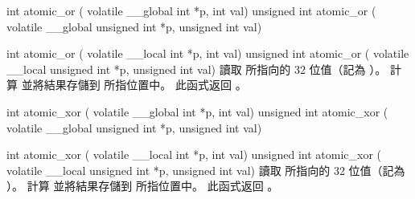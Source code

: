 int atomic_or (
	volatile __global int *p,
	int val)
unsigned int atomic_or (
	volatile __global unsigned int *p,
	unsigned int val)

int atomic_or (
	volatile __local int *p,
	int val)
unsigned int atomic_or (
	volatile __local unsigned int *p,
	unsigned int val)
\stopbuffer
{}
讀取  所指向的 32 位值（記為 ）。
計算  並將結果存儲到  所指位置中。
此函式返回 。
\stopbuffer

int atomic_xor (
	volatile __global int *p,
	int val)
unsigned int atomic_xor (
	volatile __global unsigned int *p,
	unsigned int val)

int atomic_xor (
	volatile __local int *p,
	int val)
unsigned int atomic_xor (
	volatile __local unsigned int *p,
	unsigned int val)
\stopbuffer
{}
讀取  所指向的 32 位值（記為 ）。
計算  並將結果存儲到  所指位置中。
此函式返回 。
\stopbuffer


\startCLFD
{}
\stopCLFD

